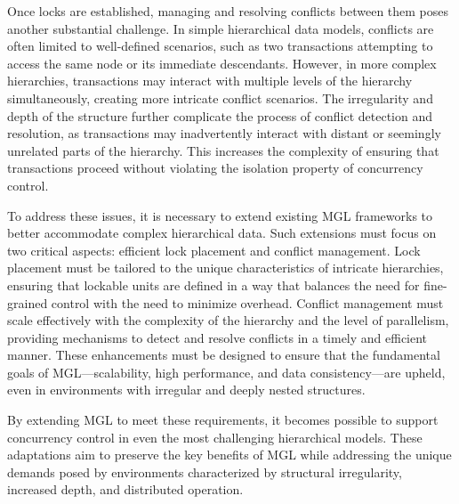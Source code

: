 Once locks are established, managing and resolving conflicts between them poses another substantial challenge. In simple hierarchical data models, conflicts are often limited to well-defined scenarios, such as two transactions attempting to access the same node or its immediate descendants. However, in more complex hierarchies, transactions may interact with multiple levels of the hierarchy simultaneously, creating more intricate conflict scenarios. The irregularity and depth of the structure further complicate the process of conflict detection and resolution, as transactions may inadvertently interact with distant or seemingly unrelated parts of the hierarchy. This increases the complexity of ensuring that transactions proceed without violating the isolation property of concurrency control.


To address these issues, it is necessary to extend existing MGL frameworks to better accommodate complex hierarchical data. Such extensions must focus on two critical aspects: efficient lock placement and conflict management. Lock placement must be tailored to the unique characteristics of intricate hierarchies, ensuring that lockable units are defined in a way that balances the need for fine-grained control with the need to minimize overhead. Conflict management must scale effectively with the complexity of the hierarchy and the level of parallelism, providing mechanisms to detect and resolve conflicts in a timely and efficient manner. These enhancements must be designed to ensure that the fundamental goals of MGL—scalability, high performance, and data consistency—are upheld, even in environments with irregular and deeply nested structures.

By extending MGL to meet these requirements, it becomes possible to support concurrency control in even the most challenging hierarchical models. These adaptations aim to preserve the key benefits of MGL while addressing the unique demands posed by environments characterized by structural irregularity, increased depth, and distributed operation.




